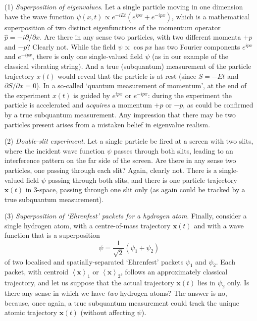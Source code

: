 \documentclass{article}%
\begin{document}
(1) \textit{Superposition of eigenvalues}. Let a single particle moving in one
dimension have the wave function $\psi(x,t)\propto e^{-iEt}\left(
e^{ipx}+e^{-ipx}\right)  $, which is a mathematical superposition of two
distinct eigenfunctions of the momentum operator $\hat{p}=-i\partial/\partial
x$. Are there in any sense two particles, with two different momenta $+p$ and
$-p$? Clearly not. While the field $\psi\propto\cos px$ has two Fourier
components $e^{ipx}$ and $e^{-ipx}$, there is only one single-valued field
$\psi$ (as in our example of the classical vibrating string). And a true
(subquantum) measurement of the particle trajectory $x(t)$ would reveal that
the particle is at rest (since $S=-Et$ and $\partial S/\partial x=0$). In a
so-called `quantum measurement of momentum', at the end of the experiment
$x(t)$ is guided by $e^{ipx}$ or $e^{-ipx}$: during the experiment the
particle is accelerated and \textit{acquires} a momentum $+p$ or $-p$, as
could be confirmed by a true subquantum measurement. Any impression that there
may be two particles present arises from a mistaken belief in eigenvalue realism.

(2) \textit{Double-slit experiment}. Let a single particle be fired at a
screen with two slits, where the incident wave function $\psi$ passes through
both slits, leading to an interference pattern on the far side of the screen.
Are there in any sense two particles, one passing through each slit? Again,
clearly not. There is a single-valued field $\psi$ passing through both slits,
and there is one particle trajectory $\mathbf{x}(t)$ in 3-space, passing
through one slit only (as again could be tracked by a true subquantum measurement).

(3) \textit{Superposition of `Ehrenfest' packets for a hydrogen atom}.
Finally, consider a single hydrogen atom, with a centre-of-mass trajectory
$\mathbf{x}(t)$ and with a wave function that is a superposition%
\[
\psi=\frac{1}{\sqrt{2}}\left(  \psi_{1}+\psi_{2}\right)
\]
of two localised and spatially-separated `Ehrenfest' packets $\psi_{1}$ and
$\psi_{2}$. Each packet, with centroid $\left\langle \mathbf{x}\right\rangle
_{1}$ or $\left\langle \mathbf{x}\right\rangle _{2}$, follows an approximately
classical trajectory, and let us suppose that the actual trajectory
$\mathbf{x}(t)$ lies in $\psi_{2}$ only. Is there any sense in which we have
\textit{two} hydrogen atoms? The answer is no, because, once again, a true
subquantum measurement could track the unique atomic trajectory $\mathbf{x}%
(t)$ (without affecting $\psi$).
\end{document}
